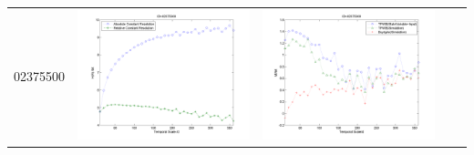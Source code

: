 \documentclass[11pt]{article}
\begin{document}
\begin{table}[H]
{\begin{tabular}{c  c   c   c  c }
02375500&\begin{minipage}{.4\textwidth}\includegraphics[width=\linewidth]{resultgraph/02375500e.png}\end{minipage}
&\begin{minipage}{.4\textwidth}\includegraphics[width=\linewidth]{resultgraph/02375500MI.png}\end{minipage}

\end{tabular}}
\end{table}
\end{document}
